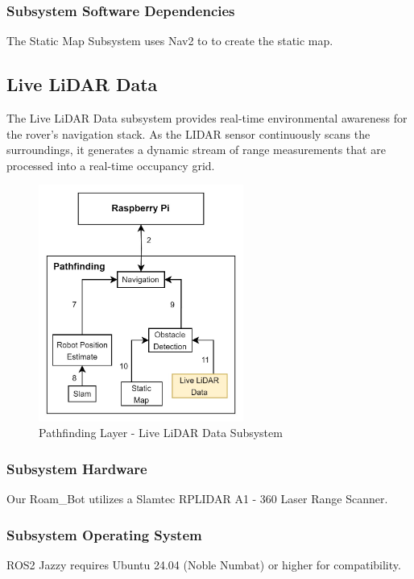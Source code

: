 \subsubsection{Subsystem Software Dependencies}
The Static Map Subsystem uses Nav2 to to create the static map.

\newpage

\subsection{Live LiDAR Data}

The Live LiDAR Data subsystem provides real-time environmental awareness for the rover's navigation stack.  As the LIDAR sensor continuously scans the surroundings, it generates a dynamic stream of range measurements that are processed into a real-time occupancy grid.


\begin{figure}[h!]
	\centering
 	\includegraphics[width=0.60\textwidth]{images/pathfinding/livelidardata.jpg}
 \caption{Pathfinding Layer - Live LiDAR Data Subsystem}
\end{figure}

\subsubsection{Subsystem Hardware}
Our Roam\_Bot utilizes a Slamtec RPLIDAR A1 - 360 Laser Range Scanner. 


\subsubsection{Subsystem Operating System}
ROS2 Jazzy requires Ubuntu 24.04 (Noble Numbat) or higher for compatibility.

